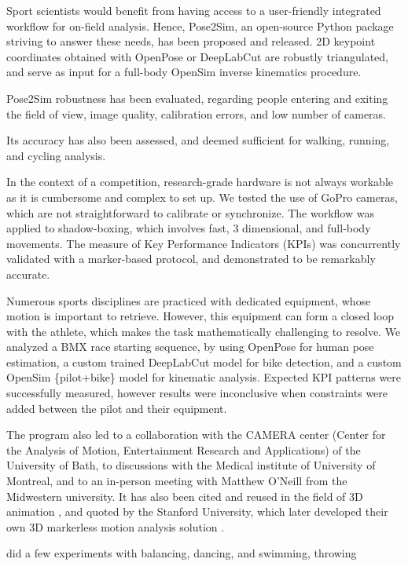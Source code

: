 Sport scientists would benefit from having access to a user-friendly integrated workflow for on-field analysis. Hence, Pose2Sim, an open-source Python package striving to answer these needs, has been proposed and released. 2D keypoint coordinates obtained with OpenPose or DeepLabCut are robustly triangulated, and serve as input for a full-body OpenSim inverse kinematics procedure.

Pose2Sim robustness has been evaluated, regarding people entering and exiting the field of view, image quality, calibration errors, and low number of cameras. 

Its accuracy has also been assessed, and deemed sufficient for walking, running, and cycling analysis. 

In the context of a competition, research-grade hardware is not always workable as it is cumbersome and complex to set up. We tested the use of GoPro cameras, which are not straightforward to calibrate or synchronize. The workflow was applied to shadow-boxing, which involves fast, 3 dimensional, and full-body movements. The measure of Key Performance Indicators (KPIs) was concurrently validated with a marker-based protocol, and demonstrated to be remarkably accurate.

Numerous sports disciplines are practiced with dedicated equipment, whose motion is important to retrieve. However, this equipment can form a closed loop with the athlete, which makes the task mathematically challenging to resolve. We analyzed a BMX race starting sequence, by using OpenPose for human pose estimation, a custom trained DeepLabCut model for bike detection, and a custom OpenSim \{pilot+bike\} model for kinematic analysis. Expected KPI patterns were successfully measured, however results were inconclusive when constraints were added between the pilot and their equipment.



The program also led to a collaboration with the CAMERA center (Center for the Analysis of Motion, Entertainment Research and Applications) of the University of Bath, to discussions with the Medical institute of University of Montreal, and to an in-person meeting with Matthew O'Neill from the Midwestern university. It has also been cited and reused in the field of 3D animation \cite{Barreto2022}, and quoted by the Stanford University, which later developed their own 3D markerless motion analysis solution \cite{Uhlrich2022}.

did a few experiments with balancing, dancing, and swimming, throwing

